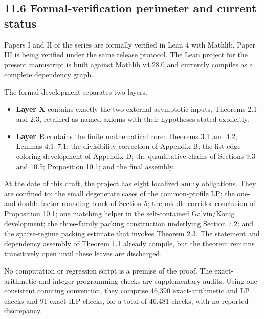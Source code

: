 \documentclass[
  11pt,
]{article}
\providecommand{\tightlist}{%
  \setlength{\itemsep}{0pt}\setlength{\parskip}{0pt}}
\begin{document}
\subsection{11.6 Formal-verification perimeter and current
status}\label{formal-verification-perimeter-and-current-status}

Papers I and II of the series are formally verified in Lean 4 with
Mathlib. Paper III is being verified under the same release protocol.
The Lean project for the present manuscript is built against Mathlib
v4.28.0 and currently compiles as a complete dependency graph.

The formal development separates two layers.

\begin{itemize}
\tightlist
\item
  \textbf{Layer X} contains exactly the two external asymptotic inputs,
  Theorems 2.1 and 2.3, retained as named axioms with their hypotheses
  stated explicitly.
\item
  \textbf{Layer E} contains the finite mathematical core: Theorems 3.1
  and 4.2; Lemmas 4.1--7.1; the divisibility correction of Appendix B;
  the list edge coloring development of Appendix D; the quantitative
  chains of Sections 9.3 and 10.5; Proposition 10.1; and the final
  assembly.
\end{itemize}

At the date of this draft, the project has eight localized
\texttt{sorry} obligations. They are confined to: the small degenerate
cases of the common-profile LP; the one- and double-factor rounding
block of Section 5; the middle-corridor conclusion of Proposition 10.1;
one matching helper in the self-contained Galvin/König development; the
three-family packing construction underlying Section 7.2; and the
sparse-regime packing estimate that invokes Theorem 2.3. The statement
and dependency assembly of Theorem 1.1 already compile, but the theorem
remains transitively open until these leaves are discharged.

No computation or regression script is a premise of the proof. The
exact-arithmetic and integer-programming checks are supplementary
audits. Using one consistent counting convention, they comprise 46,390
exact-arithmetic and LP checks and 91 exact ILP checks, for a total of
46,481 checks, with no reported discrepancy.
\end{document}
